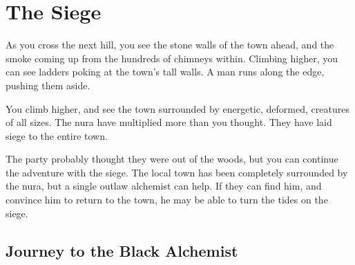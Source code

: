 \chapter{The Siege}

\begin{center}
\begin{tcolorbox}[width=35em]

	As you cross the next hill, you see the stone walls of the town ahead, and the smoke coming up from the hundreds of chimneys within.
	Climbing higher, you can see ladders poking at the town's tall walls.
	A man runs along the edge, pushing them aside.

	You climb higher, and see the town surrounded by energetic, deformed, creatures of all sizes.
	The nura have multiplied more than you thought.
	They have laid siege to the entire town.

\end{tcolorbox}
\end{center}

\noindent

\begin{multicols}{2}

\noindent
The party probably thought they were out of the woods, but you can continue the adventure with the siege.
The local town has been completely surrounded by the nura, but a single outlaw alchemist can help.
If they can find him, and convince him to return to the town, he may be able to turn the tides on the siege.

\end{multicols}

\section{Journey to the Black Alchemist}

